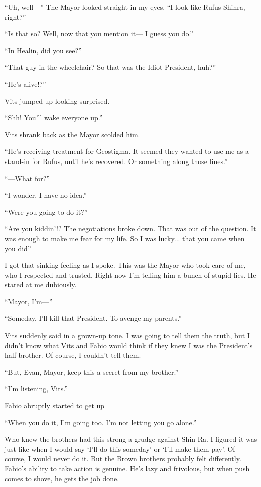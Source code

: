 \documentclass[oneside]{book}
\begin{document}
“Uh, well—” The Mayor looked straight in my eyes. “I look like Rufus Shinra, right?”

“Is that so? Well, now that you mention it— I guess you do.”

“In Healin, did you see?”

“That guy in the wheelchair? So that was the Idiot President, huh?”

“He’s alive!?”

Vits jumped up looking surprised.

“Shh! You’ll wake everyone up.”

Vits shrank back as the Mayor scolded him.

“He’s receiving treatment for Geostigma. It seemed they wanted to use me as a stand-in for Rufus, until he’s recovered. Or something along those lines.”

“—What for?”

“I wonder. I have no idea.”

“Were you going to do it?”

“Are you kiddin’!? The negotiations broke down. That was out of the question. It was enough to make me fear for my life. So I was lucky... that you came when you did”

I got that sinking feeling as I spoke. This was the Mayor who took care of me, who I respected and trusted. Right now I’m telling him a bunch of stupid lies. He stared at me dubiously.

“Mayor, I’m—”

“Someday, I’ll kill that President. To avenge my parents.”

Vits suddenly said in a grown-up tone. I was going to tell them the truth, but I didn’t know what Vits and Fabio would think if they knew I was the President’s half-brother. Of course, I couldn’t tell them.

“But, Evan, Mayor, keep this a secret from my brother.”

“I’m listening, Vits.”

Fabio abruptly started to get up

“When you do it, I’m going too. I’m not letting you go alone.”

Who knew the brothers had this strong a grudge against Shin-Ra. I figured it was just like when I would say ‘I’ll do this someday’ or ‘I’ll make them pay’. Of course, I would never do it. But the Brown brothers probably felt differently. Fabio’s ability to take action is genuine. He’s lazy and frivolous, but when push comes to shove, he gets the job done.
\end{document}
